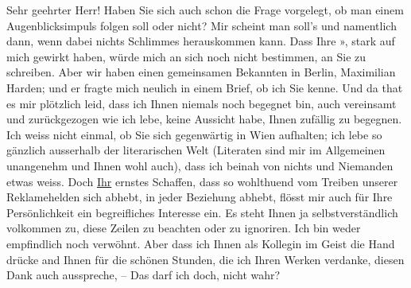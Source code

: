 \pstart{}Sehr geehrter Herr!\pend\vspace{0.5em}
\pstart
           Haben Sie sich auch schon die Frage vorgelegt, ob man einem Augenblicksimpuls folgen
               soll oder nicht? Mir scheint man soll’s und namentlich dann, wenn dabei nichts
               Schlimmes herauskommen kann. Dass Ihre »\label{K_L04332-1v}\label{K_L04332-1}, stark auf
               mich gewirkt haben, würde mich an sich noch nicht bestimmen, an Sie zu schreiben.
               Aber wir haben einen gemeinsamen Bekannten in Berlin, Maximilian Harden; und er
               fragte mich neulich in einem Brief, ob ich Sie kenne. Und da that es mir plötzlich
               leid, dass ich Ihnen niemals noch begegnet bin, auch vereinsamt und zurückgezogen wie
               ich lebe, keine Aussicht habe, Ihnen zufällig zu begegnen. Ich weiss nicht einmal, ob
               Sie sich gegenwärtig in Wien aufhalten; ich lebe
               so gänzlich ausserhalb der literarischen Welt (Literaten sind mir im Allgemeinen
               unangenehm und Ihnen wohl auch), dass ich beinah von nichts und Niemanden etwas
               weiss. Doch \uline{Ihr} ernstes Schaffen, dass so wohlthuend
               vom Treiben unserer Reklamehelden sich abhebt, in jeder Beziehung abhebt, flösst mir
                  {\pb}auch für Ihre Persönlichkeit ein begreifliches
               Interesse ein. Es steht Ihnen ja selbstverständlich volkommen zu, diese Zeilen zu
               beachten oder zu ignoriren. Ich bin weder empfindlich noch verwöhnt. Aber dass ich
               Ihnen als Kollegin im Geist die Hand drücke and Ihnen für die schönen Stunden, die
               ich Ihren Werken verdanke, diesen Dank auch ausspreche, – Das darf ich doch, nicht
               wahr?\pend
           
